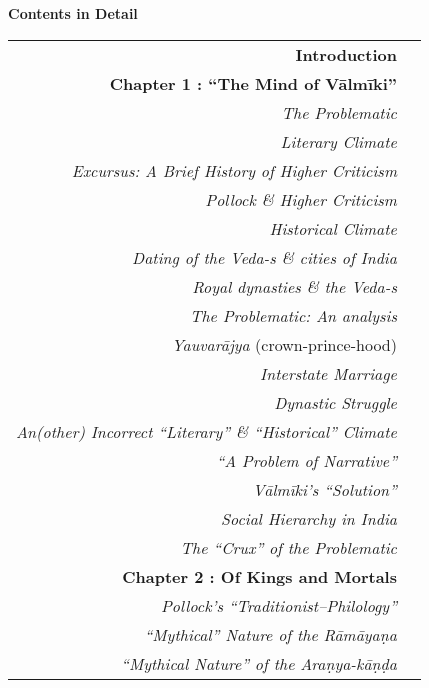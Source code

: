 \thispagestyle{empty}
\hfill{\LARGE\bfseries Contents in Detail}

\vskip 40pt

\label{cid}

{\renewcommand{\arraystretch}{1.25}
\begin{longtable}[r]{rr@{}}
{\bf Introduction} & \pageref{introduction}\\[7pt]
{\hfill\bfseries Chapter 1 : “The Mind of Vālmīki”} & \hfill\pageref{chapter1}\\
{\sl The Problematic} & \pageref{sec1.1}\\
{\sl Literary Climate} & \pageref{sec1.1.1}\\
{\sl Excursus: A   Brief History of Higher Criticism} & \pageref{sec1.1.1.1}\\
{\sl Pollock \& Higher Criticism} & \pageref{sec1.1.1.2}\\
{\sl Historical Climate} & \pageref{sec1.1.2}\\
{\sl Dating of the Veda-s \& cities of India} & \pageref{sec1.1.2.1}\\
{\sl Royal dynasties \& the Veda-s} & \pageref{sec1.1.2.3}\\
{\sl The Problematic: An analysis} & \pageref{sec1.2}\\
{\sl Yauvarājya} (crown-prince-hood) & \pageref{sec1.2.1}\\
{\sl Interstate Marriage} & \pageref{sec1.2.2}\\
{\sl Dynastic Struggle} & \pageref{sec1.2.3}\\
{\sl An(other) Incorrect “Literary” \& “Historical” Climate} & \pageref{sec1.2.3.1}\\
{\sl “A Problem of Narrative”} & \pageref{sec1.2.3.2}\\
{\sl Vālmīki’s “Solution”} & \pageref{sec1.3}\\
{\sl Social Hierarchy in India} & \pageref{sec1.3.1}\\
{\sl The “Crux” of the Problematic} & \pageref{sec1.4}\\[7pt]
{\hfill\bfseries Chapter 2 : Of Kings and Mortals} & \hfill\pageref{chapter2}\\
{\sl Pollock’s “Traditionist–Philology”} & \pageref{sec2.1}\\
{\sl “Mythical” Nature of the  Rāmāyaṇa} & \pageref{sec2.2}\\
{\sl “Mythical Nature” of the Araṇya-kāṇḍa} & \pageref{sec2.3}\\

\end{longtable}}
